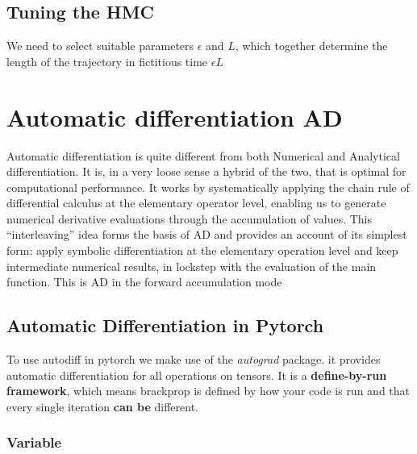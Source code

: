 \documentclass[]{report}
\begin{document}
\subsection{Tuning the HMC}

We need to select suitable parameters $\epsilon$ and $L$, which together determine the length of the trajectory in fictitious time $\epsilon L$  


\section{Automatic differentiation AD}
Automatic differentiation is quite different from both Numerical and Analytical differentiation. It is, in a very loose sense a hybrid of the two, that is optimal for computational performance. It works by systematically applying the chain rule of differential calculus at the elementary operator level, enabling us to generate numerical derivative evaluations through the accumulation of values.   
This “interleaving” idea forms the basis of AD and provides an account of
its simplest form: apply symbolic differentiation at the elementary operation
level and keep intermediate numerical results, in lockstep with the evaluation
of the main function. This is AD in the forward accumulation mode

\subsection{Automatic Differentiation in Pytorch}
To use autodiff in pytorch we make use of the \textit{autograd} package. it provides automatic differentiation for all operations on tensors. It is a \textbf{define-by-run framework}, which means brackprop is defined by how your code is run and that every single iteration \textbf{can be} different. 

\subsubsection{Variable}
\end{document}
